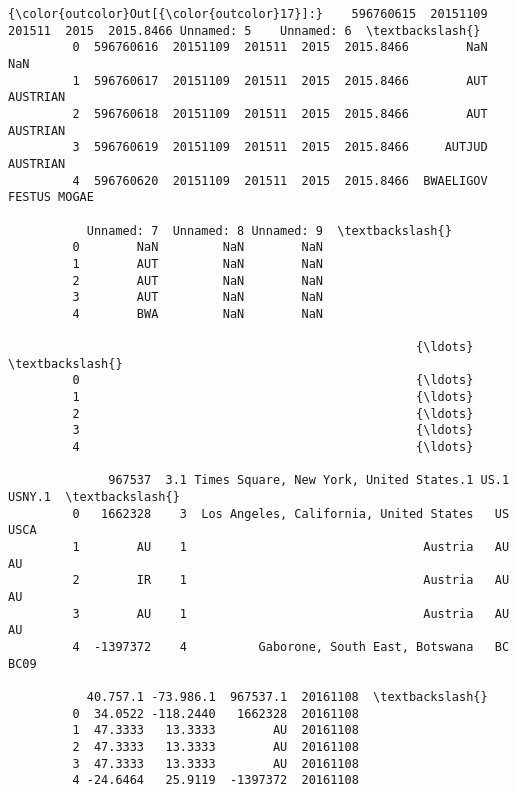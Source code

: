 \documentclass[11pt]{article}
\begin{document}
\begin{Verbatim}[commandchars=\\\{\}]
{\color{outcolor}Out[{\color{outcolor}17}]:}    596760615  20151109  201511  2015  2015.8466 Unnamed: 5    Unnamed: 6  \textbackslash{}
         0  596760616  20151109  201511  2015  2015.8466        NaN           NaN   
         1  596760617  20151109  201511  2015  2015.8466        AUT      AUSTRIAN   
         2  596760618  20151109  201511  2015  2015.8466        AUT      AUSTRIAN   
         3  596760619  20151109  201511  2015  2015.8466     AUTJUD      AUSTRIAN   
         4  596760620  20151109  201511  2015  2015.8466  BWAELIGOV  FESTUS MOGAE   
         
           Unnamed: 7  Unnamed: 8 Unnamed: 9  \textbackslash{}
         0        NaN         NaN        NaN   
         1        AUT         NaN        NaN   
         2        AUT         NaN        NaN   
         3        AUT         NaN        NaN   
         4        BWA         NaN        NaN   
         
                                                         {\ldots}                                                \textbackslash{}
         0                                               {\ldots}                                                 
         1                                               {\ldots}                                                 
         2                                               {\ldots}                                                 
         3                                               {\ldots}                                                 
         4                                               {\ldots}                                                 
         
              967537  3.1 Times Square, New York, United States.1 US.1  USNY.1  \textbackslash{}
         0   1662328    3  Los Angeles, California, United States   US    USCA   
         1        AU    1                                 Austria   AU      AU   
         2        IR    1                                 Austria   AU      AU   
         3        AU    1                                 Austria   AU      AU   
         4  -1397372    4          Gaborone, South East, Botswana   BC    BC09   
         
           40.757.1 -73.986.1  967537.1  20161108  \textbackslash{}
         0  34.0522 -118.2440   1662328  20161108   
         1  47.3333   13.3333        AU  20161108   
         2  47.3333   13.3333        AU  20161108   
         3  47.3333   13.3333        AU  20161108   
         4 -24.6464   25.9119  -1397372  20161108   
         

\end{Verbatim}
\end{document}
